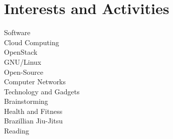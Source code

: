 \documentclass[letter,10pt]{article} %
\begin{document}

\section{Interests and Activities}
Software\\
Cloud Computing\\
OpenStack\\
GNU/Linux\\
Open-Source\\
Computer Networks\\
Technology and Gadgets\\
Brainstorming\\
Health and Fitness\\
Brazillian Jiu-Jitsu\\
Reading\\

\end{document}

